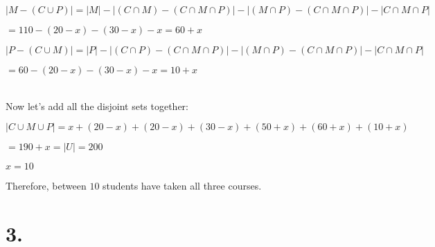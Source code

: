 \documentclass{article}
\newenvironment{Solution}
{\noindent\color{red}}
{\newline}
\begin{document}
\begin{Solution}
\begin{adjustwidth}{2em}{0em}
\begin{adjustwidth}{2em}{0em}
            $|M - (C \cup P)| = |M| - |(C \cap M) - (C \cap M \cap P)| - |(M \cap P)- (C \cap M \cap P)| - |C \cap M \cap P|$

            \hspace*{6.585em}$ = 110 - (20 - x) - (30 - x) - x = 60 + x$

            $|P - (C \cup M)| = |P| - |(C \cap P) - (C \cap M \cap P)| - |(M \cap P)- (C \cap M \cap P)| - |C \cap M \cap P|$

            \hspace*{6.585em}$ = 60 - (20 - x) - (30 - x) - x = 10 + x$
        \end{adjustwidth}
    \end{adjustwidth}

    \ \\

    Now let's add all the disjoint sets together:

    $|C \cup M \cup P| = x + (20 - x) + (20 - x) + (30 - x) + (50 + x) + (60 + x) + (10 + x)$

    \phantom{ }

    \hspace*{5.71em}$= 190 + x = |U| = 200$

    \hspace*{5.71em}$x = 10$

    \phantom{ }

    Therefore, between $10$ students have taken all three courses. 
\end{Solution}







\vspace*{5em}




\section*{3. }
\end{document}
